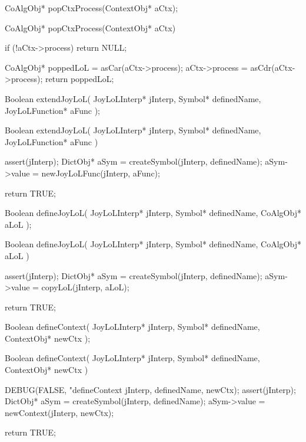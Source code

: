 \startCHeader
CoAlgObj* popCtxProcess(ContextObj* aCtx);
\stopCHeader

\startCCode
CoAlgObj* popCtxProcess(ContextObj* aCtx) {
  if (!aCtx->process) return NULL;

  CoAlgObj* poppedLoL = asCar(aCtx->process);
  aCtx->process       = asCdr(aCtx->process);
  return poppedLoL;
}
\stopCCode

\starttyping
\startCHeader
Boolean extendJoyLoL(
  JoyLoLInterp* jInterp,
  Symbol* definedName,
  JoyLoLFunction* aFunc
);
\stopCHeader

\startCCode
Boolean extendJoyLoL(
  JoyLoLInterp* jInterp,
  Symbol* definedName,
  JoyLoLFunction* aFunc
) {
  assert(jInterp);
  DictObj* aSym =
    createSymbol(jInterp, definedName);
  aSym->value = newJoyLoLFunc(jInterp, aFunc);

  return TRUE;
}
\stopCCode
\stoptyping

\startCHeader
Boolean defineJoyLoL(
  JoyLoLInterp* jInterp,
  Symbol* definedName,
  CoAlgObj* aLoL
);
\stopCHeader

\startCCode
Boolean defineJoyLoL(
  JoyLoLInterp* jInterp,
  Symbol* definedName,
  CoAlgObj* aLoL
) {
  assert(jInterp);
  DictObj* aSym =
    createSymbol(jInterp, definedName);
  aSym->value = copyLoL(jInterp, aLoL);

  return TRUE;
}
\stopCCode

\starttyping
\startCHeader
Boolean defineContext(
  JoyLoLInterp* jInterp,
  Symbol* definedName,
  ContextObj* newCtx
);
\stopCHeader

\startCCode
Boolean defineContext(
  JoyLoLInterp* jInterp,
  Symbol* definedName,
  ContextObj* newCtx
) {
  DEBUG(FALSE, "defineContext %
        jInterp, definedName, newCtx);
  assert(jInterp);
  DictObj* aSym =
    createSymbol(jInterp, definedName);
  aSym->value   = newContext(jInterp, newCtx);

  return TRUE;
}
\stopCCode
\stoptyping